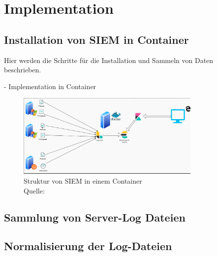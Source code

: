 \section{Implementation}

\subsection{Installation von SIEM in Container}

Hier werden die Schritte für die Installation und Sammeln von Daten beschrieben.

- Implementation in Container %
\begin{figure}[H]
   \centering
   \includegraphics[width=0.8\textwidth]{assets/3_p1.png}
   \caption{Struktur von \gls{SIEM} in einem Container \\Quelle: \citep{RDR_Docker}}
   \centering
\end{figure}


\subsection{Sammlung von Server-Log Dateien}

\subsection{Normalisierung der Log-Dateien}





